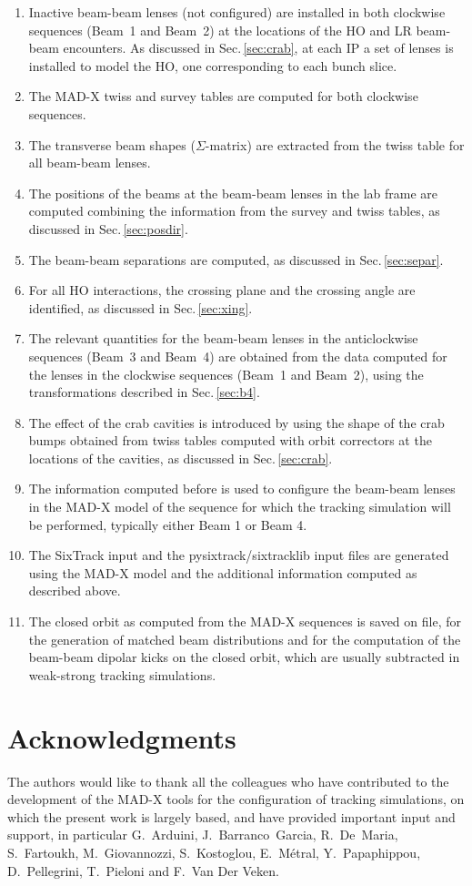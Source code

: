 \begin{enumerate}
\item Inactive beam-beam lenses (not configured) are installed in both clockwise sequences (Beam~1 and Beam~2) at the locations of the HO and LR beam-beam encounters. As discussed in Sec.\,\ref{sec:crab}, at each IP a set of lenses is installed to model the HO, one corresponding to each bunch slice.
\item The MAD-X twiss and survey tables are computed 
for both clockwise sequences.
\item The transverse beam shapes ($\Sigma$-matrix) are extracted from the twiss table for all beam-beam lenses.
\item The positions of the beams at the beam-beam lenses in the lab frame are computed combining the information from the survey and twiss tables, as discussed in Sec.\,\ref{sec:posdir}.
\item The beam-beam separations are computed, as discussed in Sec.\,\ref{sec:separ}.
\item For all HO interactions, the crossing plane and the crossing angle are identified, as discussed in Sec.\,\ref{sec:xing}.
\item The relevant quantities for the beam-beam lenses in the anticlockwise sequences (Beam~3 and Beam~4) are obtained from the data computed for the lenses in the clockwise sequences (Beam~1 and Beam~2), using the transformations described in Sec.\,\ref{sec:b4}.
\item The effect of the crab cavities is introduced by using the shape of the crab bumps obtained from twiss tables computed with orbit correctors at the locations of the cavities, as discussed in Sec.\,\ref{sec:crab}.
\item The information computed before is used to configure the beam-beam lenses in the MAD-X model of the sequence for which the tracking simulation will be performed, typically either Beam 1 or Beam 4.
\item The SixTrack input and the pysixtrack/sixtracklib input files are generated  using the MAD-X model and the additional information computed as described above. 
\item The closed orbit as computed from the MAD-X sequences is saved on file, for the generation of matched beam distributions and for the computation of the beam-beam dipolar kicks on the closed orbit, which are usually subtracted in weak-strong tracking simulations.


\end{enumerate}


\section*{Acknowledgments}
The authors would like to thank all the colleagues who  have contributed to the development of the MAD-X tools for the configuration of tracking simulations, on which the present work is largely based, and have provided important input and support, in particular G.~Arduini, J.~Barranco~Garcia, R.~De~Maria, S.~Fartoukh, M.~Giovannozzi, S.~Kostoglou, E.~M\'etral,  Y.~Papaphippou, D.~Pellegrini, T.~Pieloni and F.~Van Der Veken.